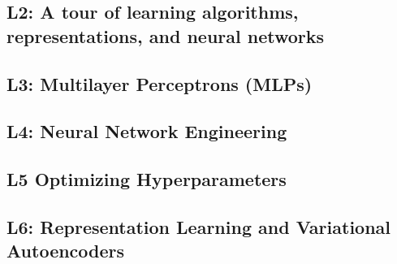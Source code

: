 \documentclass{article}
\begin{document}
\begin{definition}
    
\end{definition}

\begin{example}
    
\end{example}
\newpage

\begin{center}
    \section*{L2: A tour of learning algorithms, representations, and neural networks}
\end{center}

\newpage

\begin{center}
    \section*{L3: Multilayer Perceptrons (MLPs)}
\end{center}

\newpage

\begin{center}
    \section*{L4: Neural Network Engineering}
\end{center}

\newpage

\begin{center}
    \section*{L5 Optimizing Hyperparameters}
\end{center}

\newpage

\begin{center}
    \section*{L6: Representation Learning and Variational Autoencoders}
\end{center}

\newpage
\end{document}
